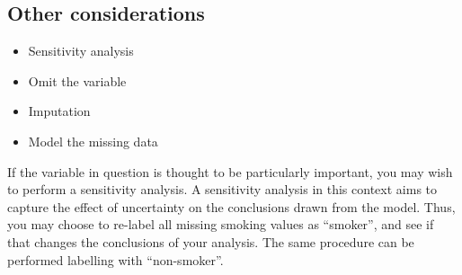 \documentclass[
  12pt,
  krantz2]{krantz}
\providecommand{\tightlist}{%
  \setlength{\itemsep}{0pt}\setlength{\parskip}{0pt}}
\begin{document}
\begin{table}[!h]

\caption{\label{tab:unnamed-chunk-17}Regression analysis with missing data: List-wise deletion.}
\centering
{}
\end{table}

\hypertarget{other-considerations}{%
\subsection{Other considerations}\label{other-considerations}}

\begin{itemize}
\tightlist
\item
  Sensitivity analysis
\item
  Omit the variable
\item
  Imputation
\item
  Model the missing data
\end{itemize}

If the variable in question is thought to be particularly important, you may wish to perform a sensitivity analysis.
A sensitivity analysis in this context aims to capture the effect of uncertainty on the conclusions drawn from the model.
Thus, you may choose to re-label all missing smoking values as ``smoker'', and see if that changes the conclusions of your analysis. The same procedure can be performed labelling with ``non-smoker''.
\end{document}
